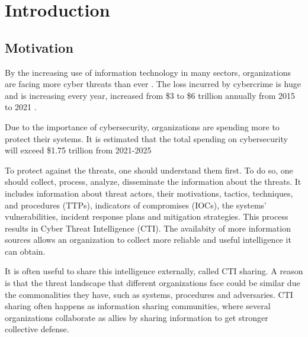 \chapter{Introduction}



\section{Motivation}

By the increasing use of information technology in many sectors, organizations are facing more cyber threats than ever \cite{skopik_problem_2016}. The loss incurred by cybercrime is huge and is  increasing every year, increased from \$3 to \$6 trillion annually from 2015 to 2021 \cite{noauthor_2023_nodate}.

Due to the importance of cybersecurity, organizations are spending more to protect their systems. It is estimated that the total spending on cybersecurity will exceed \$1.75 trillion from 2021-2025 \cite{freeze_global_2021}

To protect against the threats, one should understand them first. To do so, one should collect, process, analyze, disseminate the information about the threats. It includes information about threat actors, their motivations, tactics, techniques, and procedures (TTPs), indicators of compromises (IOCs), the systems' vulnerabilities, incident response plans and mitigation strategies. This process results in Cyber Threat Intelligence (CTI). The availabity of more information sources allows an organization to collect more reliable and useful intelligence it can obtain.

It is often useful to share this intelligence externally, called CTI sharing. A reason is that the threat landscape that different organizations face could be similar due the commonalities they have, such as systems, procedures and adversaries. CTI sharing often happens as information sharing communities, where several organizations collaborate as allies by sharing information to get stronger collective defense.


